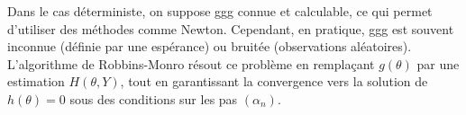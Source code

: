 




Dans le cas déterministe, on suppose ggg connue et calculable, ce qui permet d’utiliser des méthodes comme Newton. 
Cependant, en pratique, ggg est souvent inconnue (définie par une espérance) ou bruitée (observations aléatoires). 
L’algorithme de Robbins-Monro résout ce problème en remplaçant $ g( \theta) $ par une estimation 
$ H(\theta, Y)$, tout en garantissant la convergence vers la solution de $h(\theta) = 0$ sous des conditions
sur les pas $(\alpha_n)$.

